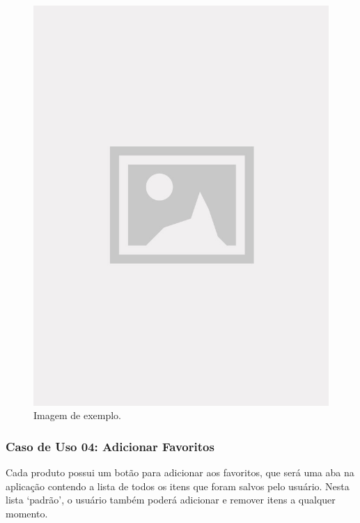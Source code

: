 \begin{figure}[!htb]
\centering
\caption{Imagem de exemplo.}
\includegraphics[width=\linewidth]{figuras/placeholder.jpg}
\end{figure}

\subsubsection{Caso de Uso 04: Adicionar Favoritos}

Cada produto possui um botão para adicionar aos favoritos, que será uma aba na aplicação contendo a lista de todos os itens que foram salvos pelo usuário. Nesta lista ‘padrão’, o usuário também poderá adicionar e remover itens a qualquer momento.

